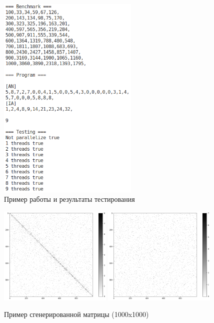 \begin{figure}[h]
    \centering
    \includegraphics[width=0.6\textwidth]{inc/e1.png}
    \caption{Пример работы и результаты тестирования}
    \label{fig:4.1}
\end{figure}

\begin{figure}[h]
    \centering
    \includegraphics[width=0.48\textwidth]{inc/m1.png}
    \includegraphics[width=0.48\textwidth]{inc/m2.png}
    \caption{Пример сгенерированной матрицы (1000x1000)}
    \label{fig:4.2}
\end{figure}



